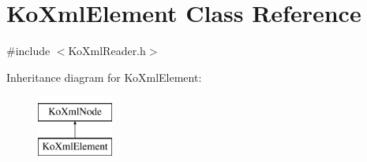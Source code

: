 \hypertarget{classKoXmlElement}{
\section{KoXmlElement Class Reference}
\label{classKoXmlElement}
}


{\ttfamily \#include $<$KoXmlReader.h$>$}

Inheritance diagram for KoXmlElement:\begin{figure}[H]
\begin{center}
\leavevmode
\includegraphics[height=2cm]{classKoXmlElement}
\end{center}
\end{figure}
